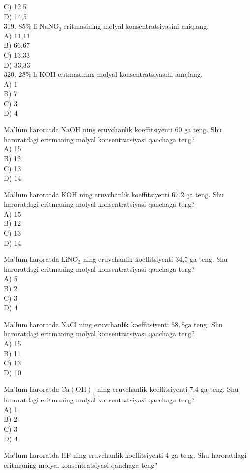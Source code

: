 C) 12,5\\
D) 14,5\\
319. $85 \%$ li $\mathrm{NaNO}_{3}$ eritmasining molyal konsentratsiyasini aniqlang.\\
A) 11,11\\
B) 66,67\\
C) 13,33\\
D) 33,33\\
320. $28 \%$ li KOH eritmasining molyal konsentratsiyasini aniqlang.\\
A) 1\\
B) 7\\
C) 3\\
D) 4
  \item Ma'lum haroratda NaOH ning eruvchanlik koeffitsiyenti 60 ga teng. Shu haroratdagi eritmaning molyal konsentratsiyasi qanchaga teng?\\
A) 15\\
B) 12\\
C) 13\\
D) 14
  \item Ma'lum haroratda KOH ning eruvchanlik koeffitsiyenti 67,2 ga teng. Shu haroratdagi eritmaning molyal konsentratsiyasi qanchaga teng?\\
A) 15\\
B) 12\\
C) 13\\
D) 14
  \item Ma'lum haroratda $\mathrm{LiNO}_{3}$ ning eruvchanlik koeffitsiyenti 34,5 ga teng. Shu haroratdagi eritmaning molyal konsentratsiyasi qanchaga teng?\\
A) 5\\
B) 2\\
C) 3\\
D) 4
  \item Ma'lum haroratda NaCl ning eruvchanlik koeffitsiyenti $58,5 \mathrm{ga}$ teng. Shu haroratdagi eritmaning molyal konsentratsiyasi qanchaga teng?\\
A) 15\\
B) 11\\
C) 13\\
D) 10
  \item Ma'lum haroratda $\mathrm{Ca}(\mathrm{OH})_{2}$ ning eruvchanlik koeffitsiyenti 7,4 ga teng. Shu haroratdagi eritmaning molyal konsentratsiyasi qanchaga teng?\\
A) 1\\
B) 2\\
C) 3\\
D) 4
  \item Ma'lum haroratda HF ning eruvchanlik koeffitsiyenti 4 ga teng. Shu haroratdagi eritmaning molyal konsentratsiyasi qanchaga teng?\\
